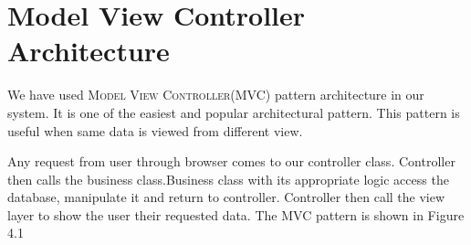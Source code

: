 \documentclass{scrreprt}
\begin{document}
\chapter{Model View Controller Architecture}

\begin{center}
\end{center} 
We have used \textsc{Model View Controller}(MVC) pattern architecture in our system. It is one of the easiest and popular architectural pattern. This pattern is useful when same data is viewed from different view. 

Any request from user through browser comes to our controller class. Controller then calls the business class.Business class with its appropriate logic access the database, manipulate it and return to controller. Controller then call the view layer to show the user their requested data. The MVC pattern is shown in Figure 4.1
\end{document}
